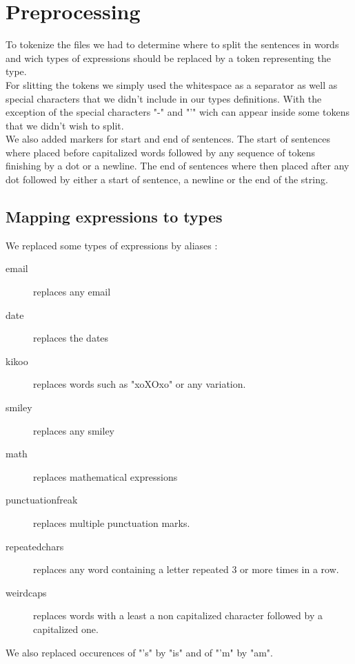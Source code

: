 \documentclass{eplDoc}
\begin{document}
\maketitle
\newpage
\addtocounter{section}{1}

\section{Preprocessing}
To tokenize the files we had to determine where to split the sentences in words and wich types of expressions should be replaced by a token representing the type. \\ 
For slitting the tokens we simply used the whitespace as a separator as well as special characters that we didn't include in our types definitions. With the exception of the special characters "-" and "'" wich can appear inside some tokens that we didn't wish to split. \\ 
We also added markers for start and end of sentences. The start of sentences where placed before capitalized words followed by any sequence of tokens finishing by a dot or a newline. The end of sentences where then placed after any dot followed by either a start of sentence, a newline or the end of the string.
\subsection{Mapping expressions to types}
We replaced some types of expressions by aliases : 
\begin{description}
	\item[email] replaces any email
	\item[date] replaces the dates
	\item[kikoo] replaces words such as "xoXOxo" or any variation.
	\item[smiley] replaces any smiley
	\item[math] replaces mathematical expressions
	\item[punctuationfreak] replaces multiple punctuation marks.
	\item[repeatedchars] replaces any word containing a letter repeated 3 or more times in a row.
	\item[weirdcaps] replaces words with a least a non capitalized character followed by a capitalized one.
\end{description}

We also replaced occurences of "'s" by "is" and of "'m" by "am".
\end{document}
